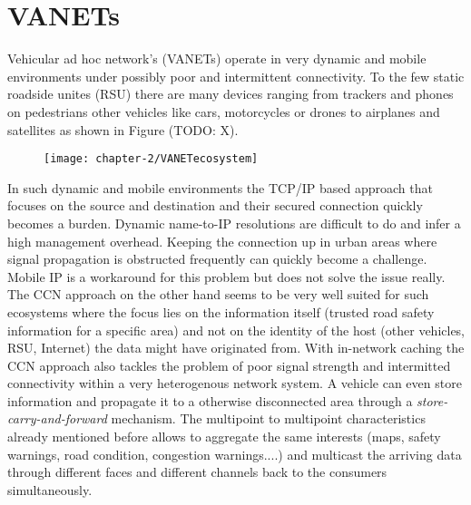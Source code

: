 \newpage
\section{VANETs}

Vehicular ad hoc network's (VANETs) operate in very dynamic and mobile environments under possibly poor and intermittent connectivity. To the few static roadside unites (RSU) there are many devices ranging from trackers and phones on pedestrians other vehicles like cars, motorcycles or drones to airplanes and satellites as shown in Figure (TODO: X).

\begin{figure}[H]
\texttt{[image: chapter-2/VANETecosystem]}
\centering
\end{figure}

In such dynamic and mobile environments the TCP/IP based approach that focuses on the source and destination and their secured connection quickly becomes a burden. Dynamic name-to-IP resolutions are difficult to do and infer a high management overhead. Keeping the connection up in urban areas where signal propagation is obstructed frequently can quickly become a challenge. Mobile IP is a workaround for this problem but does not solve the issue really. The CCN approach on the other hand seems to be very well suited for such ecosystems where the focus lies on the information itself (trusted road safety information for a specific area) and not on the identity of the host (other vehicles, RSU, Internet) the data might have originated from. With in-network caching the CCN approach also tackles the problem of poor signal strength and intermitted connectivity within a very heterogenous network system. A vehicle can even store information and propagate it to a otherwise disconnected area through a \emph{store-carry-and-forward} mechanism. The multipoint to multipoint characteristics already mentioned before allows to aggregate the same interests (maps, safety warnings, road condition, congestion warnings....) and multicast the arriving data through different faces and different channels back to the consumers simultaneously.

\vspace{5mm} %

